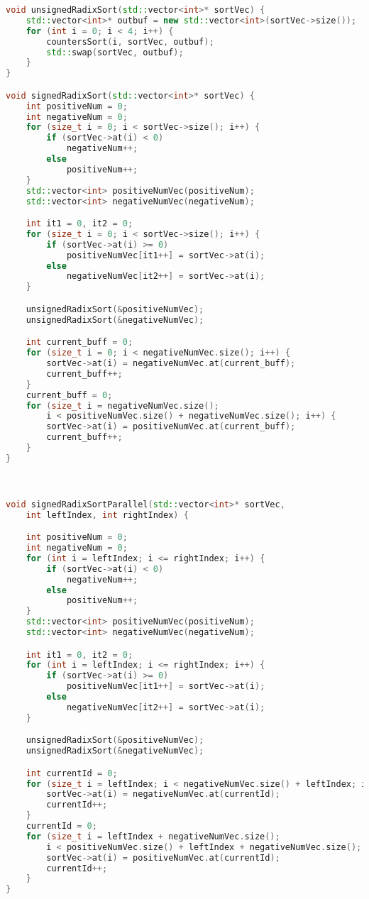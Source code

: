 \documentclass{report}
\begin{document}
\begin{lstlisting}[language=C++]
void unsignedRadixSort(std::vector<int>* sortVec) {
    std::vector<int>* outbuf = new std::vector<int>(sortVec->size());
    for (int i = 0; i < 4; i++) {
        countersSort(i, sortVec, outbuf);
        std::swap(sortVec, outbuf);
    }
}

void signedRadixSort(std::vector<int>* sortVec) {
    int positiveNum = 0;
    int negativeNum = 0;
    for (size_t i = 0; i < sortVec->size(); i++) {
        if (sortVec->at(i) < 0)
            negativeNum++;
        else
            positiveNum++;
    }
    std::vector<int> positiveNumVec(positiveNum);
    std::vector<int> negativeNumVec(negativeNum);

    int it1 = 0, it2 = 0;
    for (size_t i = 0; i < sortVec->size(); i++) {
        if (sortVec->at(i) >= 0)
            positiveNumVec[it1++] = sortVec->at(i);
        else
            negativeNumVec[it2++] = sortVec->at(i);
    }

    unsignedRadixSort(&positiveNumVec);
    unsignedRadixSort(&negativeNumVec);

    int current_buff = 0;
    for (size_t i = 0; i < negativeNumVec.size(); i++) {
        sortVec->at(i) = negativeNumVec.at(current_buff);
        current_buff++;
    }
    current_buff = 0;
    for (size_t i = negativeNumVec.size();
        i < positiveNumVec.size() + negativeNumVec.size(); i++) {
        sortVec->at(i) = positiveNumVec.at(current_buff);
        current_buff++;
    }
}



void signedRadixSortParallel(std::vector<int>* sortVec,
    int leftIndex, int rightIndex) {

    int positiveNum = 0;
    int negativeNum = 0;
    for (int i = leftIndex; i <= rightIndex; i++) {
        if (sortVec->at(i) < 0)
            negativeNum++;
        else
            positiveNum++;
    }
    std::vector<int> positiveNumVec(positiveNum);
    std::vector<int> negativeNumVec(negativeNum);

    int it1 = 0, it2 = 0;
    for (int i = leftIndex; i <= rightIndex; i++) {
        if (sortVec->at(i) >= 0)
            positiveNumVec[it1++] = sortVec->at(i);
        else
            negativeNumVec[it2++] = sortVec->at(i);
    }

    unsignedRadixSort(&positiveNumVec);
    unsignedRadixSort(&negativeNumVec);

    int currentId = 0;
    for (size_t i = leftIndex; i < negativeNumVec.size() + leftIndex; i++) {
        sortVec->at(i) = negativeNumVec.at(currentId);
        currentId++;
    }
    currentId = 0;
    for (size_t i = leftIndex + negativeNumVec.size();
        i < positiveNumVec.size() + leftIndex + negativeNumVec.size(); i++) {
        sortVec->at(i) = positiveNumVec.at(currentId);
        currentId++;
    }
}


\end{lstlisting}
\end{document}
